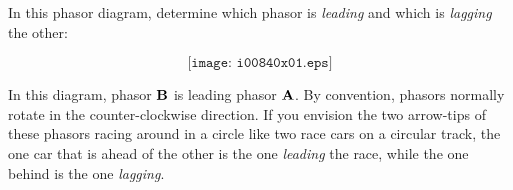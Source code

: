 

In this phasor diagram, determine which phasor is {\it leading} and which is {\it lagging} the other:

$$\texttt{[image: i00840x01.eps]}$$







In this diagram, phasor ${\bf B}$ is leading phasor ${\bf A}$.  By convention, phasors normally rotate in the counter-clockwise direction.  If you envision the two arrow-tips of these phasors racing around in a circle like two race cars on a circular track, the one car that is ahead of the other is the one {\it leading} the race, while the one behind is the one {\it lagging}.










